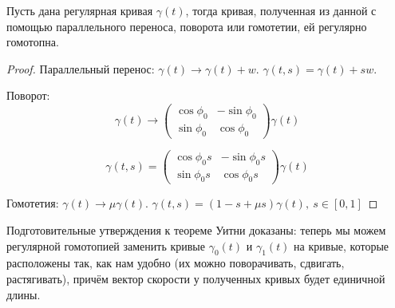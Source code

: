 

\begin{statement}
    Пусть дана регулярная кривая $\gamma(t)$, тогда кривая, полученная из данной с помощью параллельного переноса, поворота или гомотетии, ей регулярно гомотопна.
\end{statement} 
\begin{proof}
    Параллельный перенос: $\gamma(t) \to \gamma(t) + w$.
    $\gamma(t,s) = \gamma(t) + sw$.

    Поворот: $$\gamma(t) \to \begin{pmatrix}
        \cos{\phi_0} & -\sin{\phi_0} \\
        \sin{\phi_0} & \cos{\phi_0}
    \end{pmatrix} \gamma(t)$$

    $$\gamma(t,s) = \begin{pmatrix}
        \cos{\phi_0 s} & -\sin{\phi_0 s} \\
        \sin{\phi_0 s} & \cos{\phi_0 s}
    \end{pmatrix} \gamma(t)$$

    Гомотетия: $\gamma(t) \to \mu \gamma(t)$.
    $\gamma(t,s) = (1 - s + \mu s) \gamma(t), \ s \in [0,1]$
\end{proof} 

Подготовительные утверждения к теореме Уитни доказаны: теперь мы можем регулярной гомотопией заменить кривые $\gamma_0(t)$ и $\gamma_1(t)$ на кривые, которые расположены так, как нам удобно (их можно поворачивать, сдвигать, растягивать), причём вектор скорости у полученных кривых будет единичной длины.

